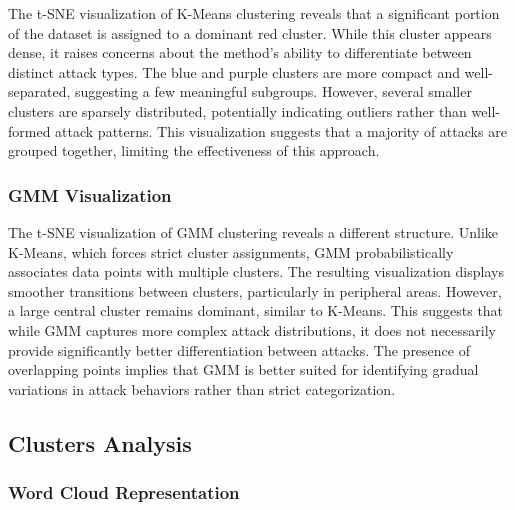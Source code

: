         The t-SNE visualization of K-Means clustering reveals that a significant portion of the dataset is assigned to a dominant red cluster. While this cluster appears dense, it raises concerns about the method’s ability to differentiate between distinct attack types. The blue and purple clusters are more compact and well-separated, suggesting a few meaningful subgroups. However, several smaller clusters are sparsely distributed, potentially indicating outliers rather than well-formed attack patterns. This visualization suggests that a majority of attacks are grouped together, limiting the effectiveness of this approach.

        \subsubsection{GMM Visualization \\}
        
        The t-SNE visualization of GMM clustering reveals a different structure. Unlike K-Means, which forces strict cluster assignments, GMM probabilistically associates data points with multiple clusters. The resulting visualization displays smoother transitions between clusters, particularly in peripheral areas. However, a large central cluster remains dominant, similar to K-Means. This suggests that while GMM captures more complex attack distributions, it does not necessarily provide significantly better differentiation between attacks. The presence of overlapping points implies that GMM is better suited for identifying gradual variations in attack behaviors rather than strict categorization.

    \subsection{Clusters Analysis}

        \subsubsection{Word Cloud Representation \\}

